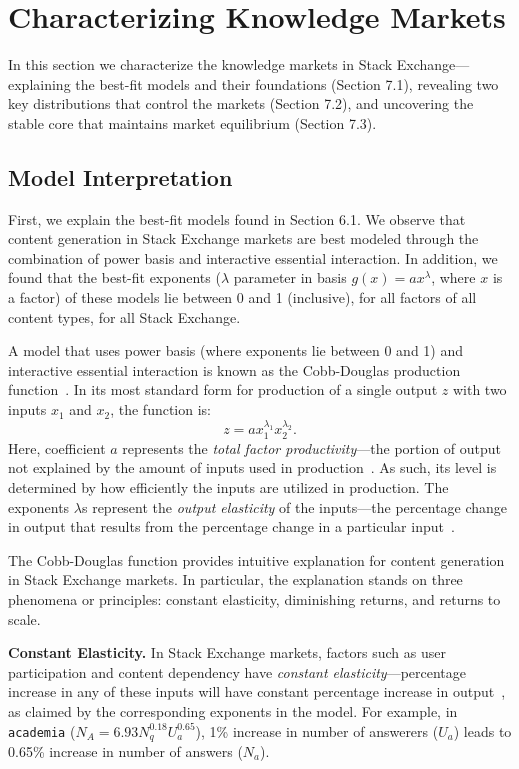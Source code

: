 \section{Characterizing Knowledge Markets}
In this section we characterize the knowledge markets in Stack Exchange---explaining the best-fit models and their foundations (Section 7.1), revealing two key distributions that control the markets (Section 7.2), and uncovering the stable core that maintains market equilibrium (Section 7.3).

\subsection{Model Interpretation} 
First, we explain the best-fit models found in Section 6.1. We observe that content generation in Stack Exchange markets are best modeled through the combination of power basis and interactive essential interaction. In addition, we found that the best-fit exponents ($\lambda$ parameter in basis $g(x) = ax^\lambda$, where $x$ is a factor) of these models lie between 0 and 1 (inclusive), for all factors of all content types, for all Stack Exchange. 

A model that uses power basis (where exponents lie between 0 and 1) and interactive essential interaction is known as the Cobb-Douglas production function~\cite{wiki}. In its most standard form for production of a single output $z$ with two inputs $x_1$ and $x_2$, the function is: 
$$z = ax_1^{\lambda_1}x_2^{\lambda_2}.$$
Here, coefficient $a$ represents the \emph{total factor productivity}---the portion of output not explained by the amount of inputs used in production~\cite{wiki}. As such, its level is determined by how efficiently the inputs are utilized in production. The exponents $\lambda$s represent the \emph{output elasticity} of the inputs---the percentage change in output that results from the percentage change in a particular input~\cite{wiki}. 

The Cobb-Douglas function provides intuitive explanation for content generation in Stack Exchange markets. In particular, the explanation stands on three phenomena or principles: constant elasticity, diminishing returns, and returns to scale.

\textbf{Constant Elasticity.} In Stack Exchange markets, factors such as user participation and content dependency have \emph{constant elasticity}---percentage increase in any of these inputs will have constant percentage increase in output~\cite{wiki}, as claimed by the corresponding exponents in the model. For example, in \texttt{academia} ($N_A = 6.93N_q^{0.18}U_a^{0.65}$), 1\% increase in number of answerers ($U_a$) leads to 0.65\% increase in number of answers ($N_a$). 

